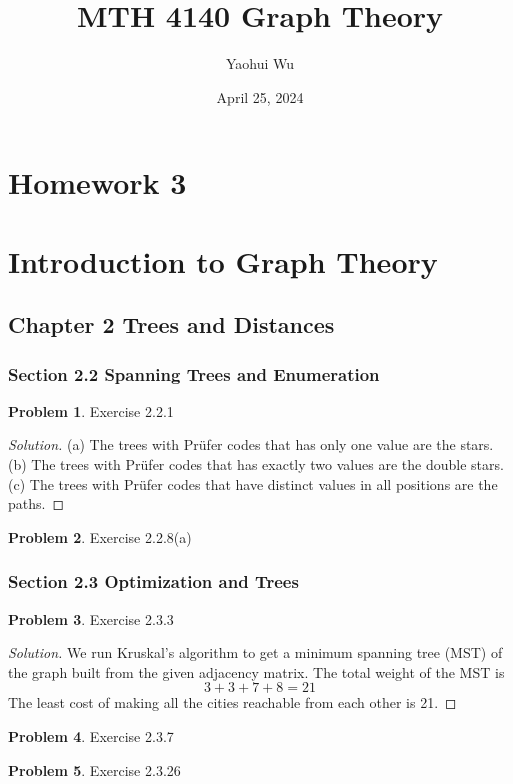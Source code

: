 \documentclass[12pt]{article}
\title{MTH 4140 Graph Theory}
\author{Yaohui Wu}
\date{April 25, 2024}
\theoremstyle{definition}
\newtheorem{problem}{Problem}
\newenvironment*{solution}{\begin{proof}[Solution]}{\end{proof}}
\begin{document}
\maketitle
\section*{Homework 3}
\section*{Introduction to Graph Theory}

\subsection*{Chapter 2 Trees and Distances}
\subsubsection*{Section 2.2 Spanning Trees and Enumeration}
\begin{problem}
    Exercise 2.2.1
\end{problem}
\begin{solution}
    (a) The trees with Prüfer codes that has only one value are the stars. (b)
    The trees with Prüfer codes that has exactly two values are the double
    stars. (c) The trees with Prüfer codes that have distinct values in all
    positions are the paths.
\end{solution}
\begin{problem}
    Exercise 2.2.8(a)
\end{problem}

\subsubsection*{Section 2.3 Optimization and Trees}
\begin{problem}
    Exercise 2.3.3
\end{problem}
\begin{solution}
    We run Kruskal's algorithm to get a minimum spanning tree (MST) of the
    graph built from the given adjacency matrix. The total weight of the MST
    is \[3+3+7+8=21\] The least cost of making all the cities reachable from
    each other is 21.
\end{solution}
\begin{problem}
    Exercise 2.3.7
\end{problem}
\begin{problem}
    Exercise 2.3.26
\end{problem}
\end{document}
